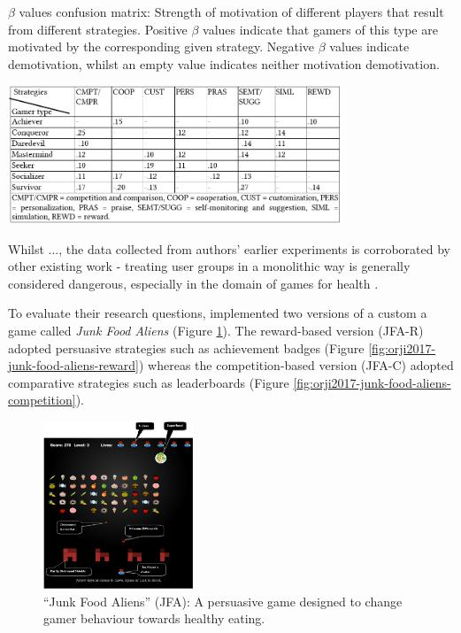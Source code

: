 \documentclass[11pt]{article}
\begin{document}
\begin{table}[H]
\centering
\caption{$\beta$ values confusion matrix: Strength of motivation of different players that result from different strategies. Positive $\beta$ values indicate that gamers of this type are motivated by the corresponding given strategy. Negative $\beta$ values indicate demotivation, whilst an empty value indicates neither motivation demotivation.
}\label{tbl:orji2017-beta-sem}
\includegraphics[width=0.75\textwidth]{img/orji2017-beta-sem.png} 
\end{table}

Whilst 	..., the data collected from authors' earlier experiments is corroborated by other existing work - treating user groups in a monolithic way is generally considered dangerous, especially in the domain of games for health \citep{berkovsky2010}. 

To evaluate their research questions, \citeauthor{orji2017} implemented two versions of a custom a game called \textit{Junk Food Aliens} (Figure \ref{fig:orji2017-junk-food-aliens}). The reward-based version (JFA-R) adopted persuasive strategies such as achievement badges (Figure \ref{fig:orji2017-junk-food-aliens-reward}) whereas the competition-based version (JFA-C) adopted comparative strategies such as leaderboards (Figure \ref{fig:orji2017-junk-food-aliens-competition}).

\begin{figure}[H]
\centering
\includegraphics[width=0.4\textwidth]{img/orji2017-junk-food-aliens.png} 
\caption{``Junk Food Aliens'' (JFA): A persuasive game designed to change gamer behaviour towards healthy eating.}\label{fig:orji2017-junk-food-aliens}
\end{figure}
\end{document}
